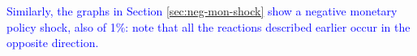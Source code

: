 \documentclass[../thesis.tex]{subfiles}
\begin{document}
\textcolor{blue}{Similarly, the graphs in Section \eqref{sec:neg-mon-shock} show a negative monetary policy shock, also of 1\%: note that all the reactions described earlier occur in the opposite direction. %
}

\begin{comment}
	
	\begin{align}
		&\Delta \hat{Z}_{M}      >0 \implies
		 \Delta \hat{R}_{}       >0 \implies
		 \Delta \hat{I}_{\eta}^D >0 \implies
		 \Delta \hat{C}_{\eta}   <0 \implies \nonumber \\
		&\Delta \hat{K}_{\eta}   <0 \implies 
		 \Delta \hat{L}_{\eta}^S > \Delta \hat{L}_{\eta}^D \implies
		 \Delta \hat{W}_{\eta}   <0 \implies
		 \Delta \hat{Y}_{\eta}   >0 \implies \nonumber \\
		&\Delta \hat{\lambda}_{\eta} <0 \implies
		 \Delta \hat{Q}_{\eta} >0 ; <0 \implies
		 \Delta \hat{P}_{\eta} >0 ; <0
	\end{align}
	
	 &  &  &  & \hat{C}_{\eta 1} & \hat{C}_{\eta 2} &  & \hat{Y}_{} & \hat{Z}_{A\eta} & 

&  &  & \hat{\pi}_{} &  &  & \hat{\pi}_{\eta}

	
\end{comment}
\end{document}
